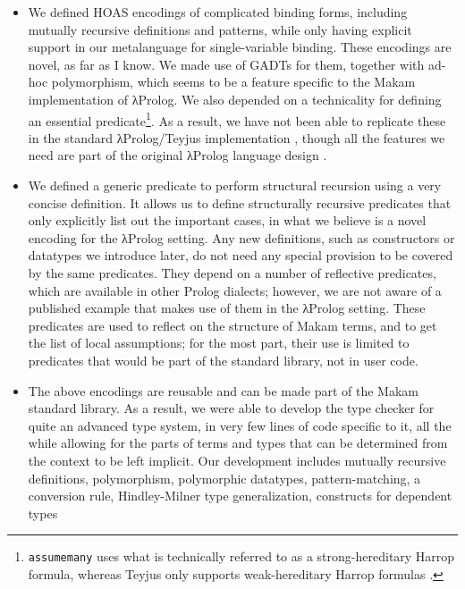 \begin{itemize}
\item
  We defined HOAS encodings of complicated binding forms, including
  mutually recursive definitions and patterns, while only having
  explicit support in our metalanguage for single-variable binding.
  These encodings are novel, as far as I know. We made use of GADTs for
  them, together with ad-hoc polymorphism, which seems to be a feature
  specific to the Makam implementation of \foreignlanguage{greek}{λ}Prolog. We also depended on a
  technicality for defining an essential
  predicate\footnote{\texttt{assumemany} uses what is technically referred to
    as a strong-hereditary Harrop formula, whereas Teyjus only supports weak-hereditary
    Harrop formulas \citep{nadathur1999system}.}. As a result, we have
  not been able to replicate these in the standard \foreignlanguage{greek}{λ}Prolog/Teyjus
  implementation \citep{nadathur1999system}, though all the features we
  need are part of the original \foreignlanguage{greek}{λ}Prolog language design
  \citep{miller1988overview}.
\item
  We defined a generic predicate to perform structural recursion using a
  very concise definition. It allows us to define structurally recursive
  predicates that only explicitly list out the important cases, in what
  we believe is a novel encoding for the \foreignlanguage{greek}{λ}Prolog setting. Any new
  definitions, such as constructors or datatypes we introduce later, do
  not need any special provision to be covered by the same predicates.
  They depend on a number of reflective predicates, which are available
  in other Prolog dialects; however, we are not aware of a published
  example that makes use of them in the \foreignlanguage{greek}{λ}Prolog setting. These
  predicates are used to reflect on the structure of Makam terms, and to
  get the list of local assumptions; for the most part, their use is
  limited to predicates that would be part of the standard library, not
  in user code.
\item
  The above encodings are reusable and can be made part of the Makam
  standard library. As a result, we were able to develop the type
  checker for quite an advanced type system, in very few lines of code
  specific to it, all the while allowing for the parts of terms and
  types that can be determined from the context to be left implicit. Our
  development includes mutually recursive definitions, polymorphism,
  polymorphic datatypes, pattern-matching, a conversion rule,
  Hindley-Milner type generalization, constructs for dependent types

\end{itemize}
